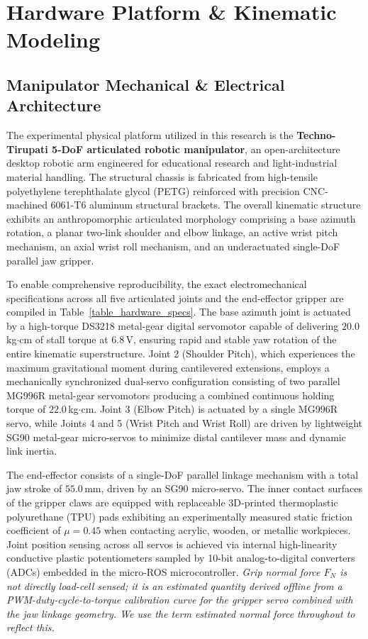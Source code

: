 \documentclass[journal]{IEEEtran}
\begin{document}
\section{Hardware Platform \& Kinematic Modeling}

\subsection{Manipulator Mechanical \& Electrical Architecture}
The experimental physical platform utilized in this research is the \textbf{Techno-Tirupati 5-DoF articulated robotic manipulator}, an open-architecture desktop robotic arm engineered for educational research and light-industrial material handling. The structural chassis is fabricated from high-tensile polyethylene terephthalate glycol (PETG) reinforced with precision CNC-machined 6061-T6 aluminum structural brackets. The overall kinematic structure exhibits an anthropomorphic articulated morphology comprising a base azimuth rotation, a planar two-link shoulder and elbow linkage, an active wrist pitch mechanism, an axial wrist roll mechanism, and an underactuated single-DoF parallel jaw gripper.

To enable comprehensive reproducibility, the exact electromechanical specifications across all five articulated joints and the end-effector gripper are compiled in Table~\ref{table_hardware_specs}. The base azimuth joint is actuated by a high-torque DS3218 metal-gear digital servomotor capable of delivering $20.0$\,kg$\cdot$cm of stall torque at $6.8$\,V, ensuring rapid and stable yaw rotation of the entire kinematic superstructure. Joint 2 (Shoulder Pitch), which experiences the maximum gravitational moment during cantilevered extensions, employs a mechanically synchronized dual-servo configuration consisting of two parallel MG996R metal-gear servomotors producing a combined continuous holding torque of $22.0$\,kg$\cdot$cm. Joint 3 (Elbow Pitch) is actuated by a single MG996R servo, while Joints 4 and 5 (Wrist Pitch and Wrist Roll) are driven by lightweight SG90 metal-gear micro-servos to minimize distal cantilever mass and dynamic link inertia.

The end-effector consists of a single-DoF parallel linkage mechanism with a total jaw stroke of $55.0$\,mm, driven by an SG90 micro-servo. The inner contact surfaces of the gripper claws are equipped with replaceable 3D-printed thermoplastic polyurethane (TPU) pads exhibiting an experimentally measured static friction coefficient of $\mu = 0.45$ when contacting acrylic, wooden, or metallic workpieces. Joint position sensing across all servos is achieved via internal high-linearity conductive plastic potentiometers sampled by 10-bit analog-to-digital converters (ADCs) embedded in the micro-ROS microcontroller. \textit{Grip normal force $F_N$ is not directly load-cell sensed; it is an estimated quantity derived offline from a PWM-duty-cycle-to-torque calibration curve for the gripper servo combined with the jaw linkage geometry. We use the term \emph{estimated normal force} throughout to reflect this.}
\end{document}
